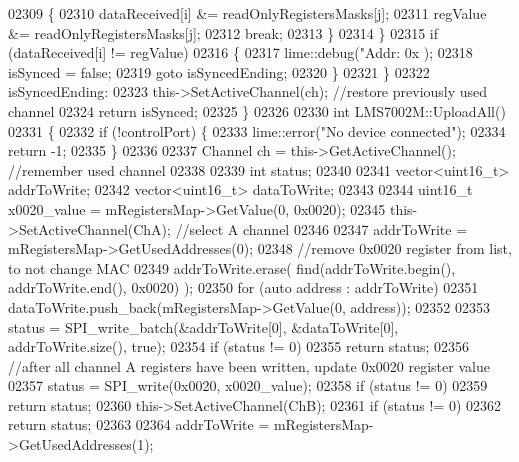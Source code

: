 \begin{DoxyCode}
{{{{{{{{{{{{{{{{{{{{{{{{{{{{{{{{{{{{{{{{{{{{{{{{{{{{{{{{{{{{{{{02309                 \{
02310                     dataReceived[i] &= readOnlyRegistersMasks[j];
02311                     regValue &= readOnlyRegistersMasks[j];
02312                     \textcolor{keywordflow}{break};
02313                 \}
02314         \}
02315         \textcolor{keywordflow}{if} (dataReceived[i] != regValue)
02316         \{
02317             lime::debug(\textcolor{stringliteral}{"Addr: 0x%
      );
02318             isSynced = \textcolor{keyword}{false};
02319             \textcolor{keywordflow}{goto} isSyncedEnding;
02320         \}
02321     \}
02322 isSyncedEnding:
02323     this->SetActiveChannel(ch); \textcolor{comment}{//restore previously used channel}
02324     \textcolor{keywordflow}{return} isSynced;
02325 \}
02326 
02330 \textcolor{keywordtype}{int} LMS7002M::UploadAll()
02331 \{
02332     \textcolor{keywordflow}{if} (!controlPort) \{
02333         lime::error(\textcolor{stringliteral}{"No device connected"});
02334         \textcolor{keywordflow}{return} -1;
02335     \}
02336 
02337     Channel ch = this->GetActiveChannel(); \textcolor{comment}{//remember used channel}
02338 
02339     \textcolor{keywordtype}{int} status;
02340 
02341     vector<uint16\_t> addrToWrite;
02342     vector<uint16\_t> dataToWrite;
02343 
02344     uint16\_t x0020\_value = mRegistersMap->GetValue(0, 0x0020);
02345     this->SetActiveChannel(ChA); \textcolor{comment}{//select A channel}
02346 
02347     addrToWrite = mRegistersMap->GetUsedAddresses(0);
02348     \textcolor{comment}{//remove 0x0020 register from list, to not change MAC}
02349     addrToWrite.erase( find(addrToWrite.begin(), addrToWrite.end(), 0x0020) );
02350     \textcolor{keywordflow}{for} (\textcolor{keyword}{auto} address : addrToWrite)
02351         dataToWrite.push\_back(mRegistersMap->GetValue(0, address));
02352 
02353     status = SPI_write_batch(&addrToWrite[0], &dataToWrite[0], addrToWrite.size(), \textcolor{keyword}{true});
02354     \textcolor{keywordflow}{if} (status != 0)
02355         \textcolor{keywordflow}{return} status;
02356     \textcolor{comment}{//after all channel A registers have been written, update 0x0020 register value}
02357     status = SPI_write(0x0020, x0020\_value);
02358     \textcolor{keywordflow}{if} (status != 0)
02359         \textcolor{keywordflow}{return} status;
02360     this->SetActiveChannel(ChB);
02361     \textcolor{keywordflow}{if} (status != 0)
02362         \textcolor{keywordflow}{return} status;
02363 
02364     addrToWrite = mRegistersMap->GetUsedAddresses(1);
}}}}}}}}}}}}}}}}}}}}}}}}}}}}}}}}}}}}}}}}}}}}}}}}}}}}}}}}}}}}}}}}
\end{DoxyCode}

